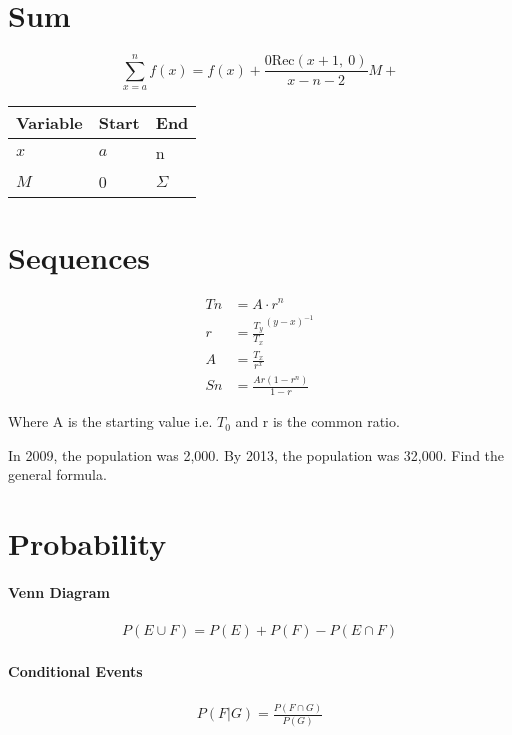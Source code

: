 \documentclass[11pt]{article}
\newcommand{\Rec}{\text{Rec}}
\begin{document}
    \section{Sum}\label{sec:sum}
    \[
        \sum_{x=a}^{n} f\left(x\right) =
        f(x) + \frac{0\Rec\left( x+1,~0\right)} {x -n -2} M+
    \]

    \begin{center}
        \begin{tabular}{|l|l|l|}
            \hline
            Variable & Start & End      \\
            \hline
            $x$      & $a$   & n        \\
            \hline
            $M$      & 0     & $\Sigma$ \\
            \hline
        \end{tabular}
    \end{center}


    \section{Sequences}\label{sec:sequences}
    \begin{align}
        Tn &=  A \cdot r^n \\
        r &=  {\frac {T_y} {T_x} } ^ { \left( y-x \right) ^ {-1} }  \\
        A &= \frac {T_x} {r^x}  \\
        Sn &= \frac{ Ar \left( 1 - r^n \right) } { 1 - r }
    \end{align}

    Where A is the starting value i.e. $T_0$ and r is the common ratio.

    In 2009, the population was 2,000.
    By 2013, the population was 32,000.
    Find the general formula.


    \section{Probability}\label{sec:probability}

    \paragraph{Venn Diagram}
    \begin{align}
        P\left(E \cup F\right) = P\left(E\right) + P\left(F\right) - P\left(E \cap F\right)
    \end{align}

    \paragraph{Conditional Events}
    \begin{align}
        P\left(F|G\right) = \frac{P\left(F \cap G\right) } { P\left(G\right) }
    \end{align}
\end{document}
